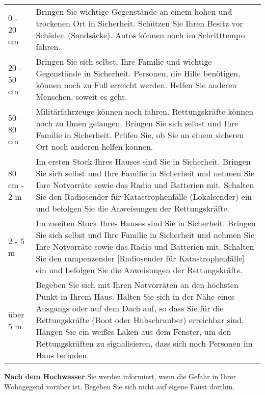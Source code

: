 \begin{tabular}[]{l p{10cm}}
0 - 20 cm &
Bringen Sie wichtige Gegenstände an einem hohen und trockenen Ort in Sicherheit. 
\newline Schützen Sie Ihren Besitz vor Schäden (Sandsäcke).
\newline Autos können noch im Schritttempo fahren. 
\newline\\ 
20 - 50 cm &
Bringen Sie sich selbst, Ihre Familie und wichtige Gegenstände in Sicherheit.
\newline Personen, die Hilfe benötigen, können noch zu Fuß erreicht werden. Helfen Sie anderen Menschen, soweit es geht.
\newline\\
50 - 80 cm &
Militärfahrzeuge können noch fahren. Rettungskräfte können noch zu Ihnen gelangen.
\newline Bringen Sie sich selbst und Ihre Familie in Sicherheit.
\newline Prüfen Sie, ob Sie an einem sicheren Ort noch anderen helfen können.
\newline\\
80 cm - 2 m &
Im ersten Stock Ihres Hauses sind Sie in Sicherheit.
\newline Bringen Sie sich selbst und Ihre Familie in Sicherheit und nehmen Sie Ihre Notvorräte sowie das Radio und Batterien mit.
\newline Schalten Sie den Radiosender für Katastrophenfälle (Lokalsender) ein und befolgen Sie die Anweisungen der Rettungskräfte.
\newline\\
2 - 5 m &
Im zweiten Stock Ihres Hauses sind Sie in Sicherheit.
\newline Bringen Sie sich selbst und Ihre Familie in Sicherheit und nehmen Sie Ihre Notvorräte sowie das Radio und Batterien mit.
\newline Schalten Sie den rampenzender [Radiosender für Katastrophenfälle] ein und befolgen Sie die Anweisungen der Rettungskräfte.
\newline\\
über 5 m &
Begeben Sie sich mit Ihren Notvorräten an den höchsten Punkt in Ihrem Haus.
\newline Halten Sie sich in der Nähe eines Ausgangs oder auf dem Dach auf, so dass Sie für die Rettungskräfte (Boot oder Hubschrauber) erreichbar sind. 
\newline Hängen Sie ein weißes Laken aus dem Fenster, um den Rettungskräften zu signalisieren, dass sich noch Personen im Haus befinden.
\\
\end{tabular}
\newline\newline 
\textnormal{\newline\bfseries Nach dem Hochwasser}
\newline 
Sie werden informiert, wenn die Gefahr in Ihrer Wohngegend vorüber ist. Begeben Sie sich nicht auf eigene Faust dorthin.
\newline\newline

